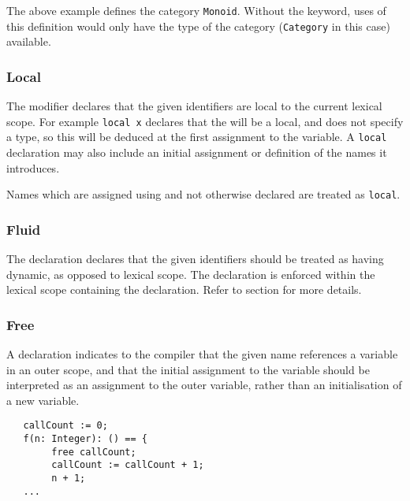The above example defines the category {\tt Monoid}. Without the
 keyword, uses of this definition would only have the
type of the category ({\tt Category} in this case) available.

\subsubsection{Local}

The  modifier declares that the given identifiers are
local to the current lexical scope. For example \verb+local x+ declares that
the  will be a local, and does not specify a type, so this
will be deduced at the first assignment to the variable.
A {\tt local} declaration may also include an initial assignment or
definition of the names it introduces.

Names which are assigned using \ttin{:=} and
not otherwise declared are treated as {\tt local}.

\subsubsection{Fluid}

The  declaration declares that the given identifiers should
be treated as having dynamic, as opposed to lexical scope. The
declaration is enforced within the lexical scope containing the
declaration. Refer to section  for more
details.

\subsubsection{Free}

A  declaration indicates to the compiler that the given name
references a variable in an outer scope, and that the initial
assignment to the variable should be interpreted as an assignment to
the outer variable, rather than an initialisation of a new variable.

\begin{small}
\begin{verbatim}
   callCount := 0;
   f(n: Integer): () == {
        free callCount;
        callCount := callCount + 1;
        n + 1;
   ...
\end{verbatim}
\end{small}

